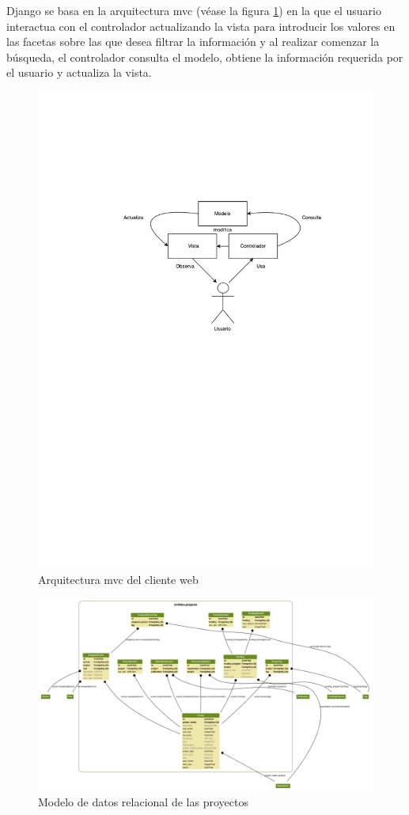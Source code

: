 Django se basa en la arquitectura \acrshort{mvc} (véase la figura \ref{fig:mvc}) en la que el usuario interactua con el controlador actualizando la vista para introducir los valores en las facetas sobre las que desea filtrar la información y al realizar comenzar la búsqueda, el controlador consulta el modelo, obtiene la información requerida por el usuario y actualiza la vista.

\begin{figure}[!htbp]
	\centering
	\includegraphics[scale=0.6]{fig/mvc}
	\caption{Arquitectura \acrshort{mvc} del cliente web}
	\label{fig:mvc}
\end{figure}

\begin{figure}[!htbp]
	\centering
	\includegraphics[angle=90, scale=0.35]{fig/dbmodel/projects}
	\caption{Modelo de datos relacional de las proyectos}
	\label{fig:projectsmodel}
\end{figure}

